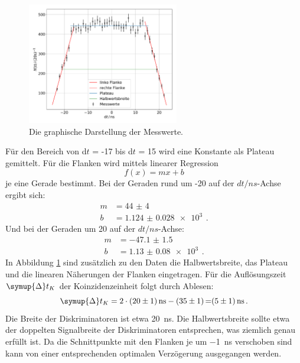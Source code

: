 \documentclass[
  bibliography=totoc,     %
  captions=tableheading,  %
  titlepage=firstiscover, %
]{scrartcl}
\begin{document}
\begin{figure}
  \centering
  \includegraphics[width=0.59\textwidth]{Plateau20.pdf}
  \caption{Die graphische Darstellung der Messwerte.}
  \label{fig:2}
\end{figure}
\noindent
Für den Bereich von d$t$ = -17 bis d$t$ = 15 wird eine Konstante als Plateau gemittelt.
Für die Flanken wird mittels linearer Regression
\begin{equation*}
  f(x) = mx + b
\end{equation*}
je eine Gerade bestimmt.
Bei der Geraden rund um -20 auf der $dt/ns$-Achse ergibt sich:
\begin{align}
  m &= \SI{44(4)}{} \\
  b &= \SI{1.124(28)e3}{} \, .
\end{align}
Und bei der Geraden um 20 auf der $dt/ns$-Achse:
\begin{align}
  m &= \SI{-47.1(15)}{} \\
  b &= \SI{1.13(8)e3}{} \, .
\end{align}
In Abbildung \ref{fig:2} sind zusätzlich zu den Daten die Halbwertsbreite, das
Plateau und die linearen Näherungen der Flanken eingetragen.
Für die Auflösungszeit
$\symup{\Delta}t_K$ der Koinzidenzeinheit folgt durch Ablesen:
\begin{equation}
  \symup{\Delta}t_K = 2 \cdot \SI{20(1)}{\nano\second} - \SI{35(1)} = \SI{5(1)}{\nano\second} \, .
\end{equation}
Die Breite der Diskriminatoren ist etwa \SI{20}{\nano\second}. Die Halbwertsbreite sollte
etwa der doppelten Signalbreite der Diskriminatoren entsprechen, was ziemlich genau
erfüllt ist. Da die Schnittpunkte mit den Flanken je um \SI{-1}{\nano\second} verschoben
sind kann von einer entsprechenden optimalen Verzögerung ausgegangen werden.
\end{document}
